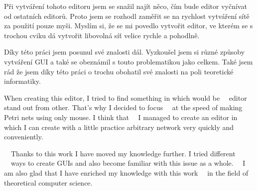 \documentclass[
  biblatex,
  glossaries,
  printversion
]{kidiplom}
\begin{document}
\begin{kiconclusions}
  Při vytváření tohoto editoru jsem se snažil najít něco, čím bude 
  editor vyčnívat od ostatních editorů. Proto jsem se rozhodl zaměřit
  se na rychlost vytváření sítě za použití pouze myši. Myslím si, že se 
  mi povedlo vytvořit editor, ve kterém se s trochou cviku dá vytvořit 
  libovolná síť velice rychle a pohodlně.

  Díky této práci jsem posunul své znalosti dál. Vyzkoušel jsem si různé 
  způsoby vytváření GUI a také se obeznámil s touto problematikou jako celkem.
  Také jsem rád že jsem díky této práci o trochu obohatil své znalosti 
  na poli teoretické informatiky.
\end{kiconclusions}

\begin{kiconclusions}[english]
  When creating this editor, I tried to find something in which would be
  editor stand out from other. That's why I decided to focus
  at the speed of making Petri nets using only mouse. I think that
  I managed to create an editor in which I can create with a little practice
  arbitrary network very quickly and conveniently.

  Thanks to this work I have moved my knowledge further. I tried different
  ways to create GUIs and also become familiar with this issue as a whole.
  I am also glad that I have enriched my knowledge with this work
  in the field of theoretical computer science.
\end{kiconclusions}

\nocite{*}

\printbibliography
\end{document}
